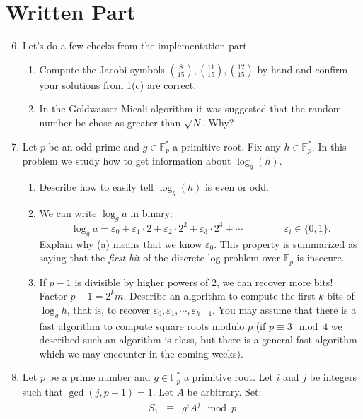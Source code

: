 \documentclass[11pt]{article}
\newcommand{\bF}{\mathbb{F}}
\begin{document}
\section*{Written Part}
\begin{enumerate}
  \setcounter{enumi}{5}
  \item{
  Let's do a few checks from the implementation part.
  \begin{enumerate}
    \item{
    Compute the Jacobi symbols $\left(\frac{8}{15}\right),\left(\frac{11}{15}\right),\left(\frac{12}{15}\right)$ by hand and confirm your solutions from 1(c) are correct.
    }
    \item{
    In the Goldwasser-Micali algorithm it was suggested that the random number be chose as greater than $\sqrt N$.  Why?
    }
  \end{enumerate}
  }
  \item{
  Let $p$ be an odd prime and $g\in\bF_p^*$ a primitive root.  Fix any $h\in\bF_p^*$.  In this problem we study how to get information about $\log_g(h)$.
  \begin{enumerate}
    \item{
    Describe how to easily tell $\log_g(h)$ is even or odd.
    }
    \item{
    We can write $\log_g a$ in binary:
    \[\log_ga = \varepsilon_0 + \varepsilon_1\cdot 2 + \varepsilon_2\cdot 2^2 + \varepsilon_3\cdot 2^3 + \cdots\hspace{50pt}\varepsilon_i\in\{0,1\}.\]
    Explain why (a) means that we know $\varepsilon_0$.  This property is summarized as saying that the \textit{first bit} of the discrete log problem over $\bF_p$ is insecure.
    }
    \item{
    If $p-1$ is divisible by higher powers of 2, we can recover more bits!  Factor $p-1 = 2^k m$.  Describe an algorithm to compute the first $k$ bits of $\log_g h$, that is, to recover $\varepsilon_0,\varepsilon_1,\cdots,\varepsilon_{k-1}$.  You may assume that there is a fast algorithm to compute square roots modulo $p$ (if $p\equiv 3\mod 4$ we described such an algorithm is class, but there is a general fast algorithm which we may encounter in the coming weeks).
    }
  \end{enumerate}
  }
  \item{
  Let $p$ be a prime number and $g\in\bF_p^*$ a primitive root.  Let $i$ and $j$ be integers such that $\gcd(j,p-1)=1$.  Let $A$ be arbitrary.  Set:
  \begin{eqnarray*}
    S_1&\equiv& g^iA^j\mod p\\

\end{eqnarray*}}
\end{enumerate}
\end{document}

